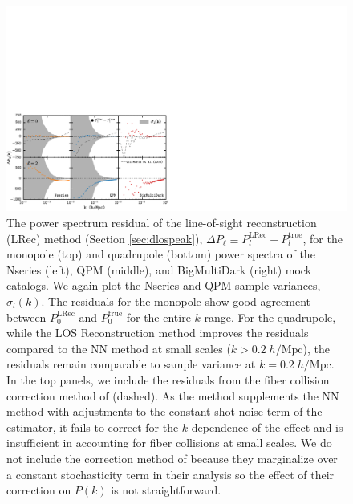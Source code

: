 \begin{figure}
\begin{center}
\includegraphics[scale=0.55]{figs/fc/mock_catalog_dlospeak_true_Plk_resid_floran_offset250_0_rebin6x.pdf} 
\caption{The power spectrum residual of the line-of-sight reconstruction (LRec) 
method (Section \ref{sec:dlospeak}), 
$\Delta P_\ell \equiv P_l^\mathrm{LRec} -P_l^\mathrm{true}$, 
for the monopole (top) and quadrupole (bottom) power spectra of the 
Nseries (left), QPM (middle), and BigMultiDark (right) mock catalogs. 
We again plot the Nseries and QPM sample variances, $\sigma_l(k)$.
The residuals for the monopole show good agreement between 
$P_0^\mathrm{LRec}$ and $P_0^\mathrm{true}$ for the entire $k$ range. 
For the quadrupole, while the LOS Reconstruction method improves the residuals 
compared to the NN method at small scales ($k > 0.2\;h/\mathrm{Mpc}$), 
the residuals remain comparable to sample variance at $k=0.2\;h/\mathrm{Mpc}$.
In the top panels, we include the residuals from the fiber collision 
correction method of \cite{Gil-Marin:2014aa} (dashed). 
As the \cite{Gil-Marin:2014aa} method supplements 
the NN method with adjustments to the constant shot noise term of the estimator, 
it fails to correct for the $k$ dependence of the effect and is insufficient 
in accounting for fiber collisions at small scales. 
We do not include the correction method of \cite{Beutler:2014aa} because they 
marginalize over a constant stochasticity term in their analysis so the effect 
of their correction on $P(k)$ is not straightforward.}
\label{fig:peaksn}
\end{center}
\end{figure}

